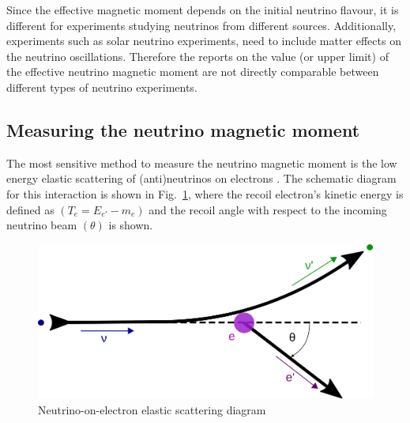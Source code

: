 Since the effective magnetic moment depends on the initial neutrino flavour, it is different for experiments studying neutrinos from different sources. Additionally, experiments such as solar neutrino experiments, need to include matter effects on the neutrino oscillations. Therefore the reports on the value (or upper limit) of the effective neutrino magnetic moment are not directly comparable between different types of neutrino experiments.


\subsection{Measuring the neutrino magnetic moment}\label{sec:MeasuringNuMM}
The most sensitive method to measure the neutrino magnetic moment is the low energy elastic scattering of (anti)neutrinos on electrons \cite{nuElmagInt2015.pdf}. The schematic diagram for this interaction is shown in Fig.~\ref{fig:NuoneDiagram}, where the recoil electron's kinetic energy is defined as $\left(T_e=E_{e\prime}-m_e\right)$ and the recoil angle with respect to the incoming neutrino beam $\left(\theta\right)$ is shown.
\begin{figure}[hbtp]
\centering
\includegraphics[width=0.55\linewidth]{Plots/NuMM/NuoneInteraction.png}
\caption{Neutrino-on-electron elastic scattering diagram}
\label{fig:NuoneDiagram}
\end{figure}


